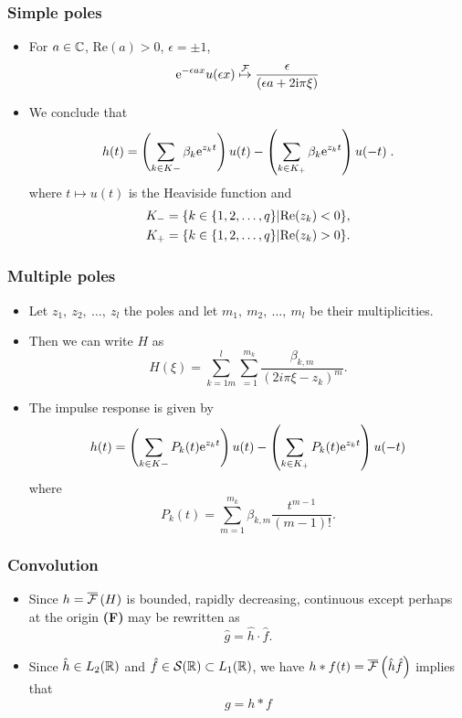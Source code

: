 \begin{frame}
\frametitle{Simple poles}
\begin{itemize}
\item For $a \in \mathbb{C}$, $\mathrm{Re}(a) > 0$, $\epsilon= \pm 1$,
\[
\mathrm{e}^{-\epsilon a x} u(\epsilon x) \stackrel{\mathcal{F}}{\mapsto} \frac{\epsilon}{(\epsilon a + 2 \mathrm{i} \pi \xi)}
\]
\item We conclude that
$$
h(t)=\left(\sum_{k\in K-}\beta_{k} \mathrm{e}^{z_{k}t} \right)u(t)- \left(\sum_{k\in K_{+}}\beta_{k} \mathrm{e}^{z_{k}t} \right)u(-t) \;.
$$
where $t \mapsto u(t)$ is the Heaviside function and
\begin{align*}
K_{-} &=\{k\in\{1,2,\ldots,q\}|{\rm Re}(z_{k})<0\}, \\
K_{+} &=\{k\in\{1,2,\ldots,q\}|{\rm Re}(z_{k})>0\}.
\end{align*}
\end{itemize}
\end{frame}

\begin{frame}
\frametitle{Multiple poles}
\begin{itemize}
\item Let $z_{1},\ z_{2},\ \ldots,\ z_{l}$ the poles and let $m_{1},\ m_{2},\ \ldots,\ m_{l}$ be their multiplicities.
\item Then we can write $H$ as
$$
H(\xi)=\sum_{k=1m}^{l}\sum_{=1}^{m_{k}}\frac{\beta_{k,m}}{(2i\pi\xi-z_{k})^{m}}.
$$
\item The impulse response is given by
$$
h(t)=\left(\displaystyle \sum_{k\in K-}P_{k}(t) \mathrm{e}^{z_{k}t}\right)u(t)-\left(\sum_{k\in K_{+}}P_{k}(t) \mathrm{e}^{z_{k}t}\right)u(-t)
$$
where
$$
P_{k}(t)=\sum_{m=1}^{m_{k}}\beta_{k,m} \frac{t^{m-1}}{(m-1)!}.
$$
\end{itemize}
\end{frame}


\begin{frame}
\frametitle{Convolution}
\begin{itemize}
\item Since $h=\overline{\mathcal{F}}\left( H \right)$ is bounded, rapidly decreasing, continuous except perhaps at the origin
\alert{\textbf{(F)}} may be rewritten as
$$
\hat{g}=\hat{h}\cdot\hat{f}.
$$
\item Since $\hat{h} \in L_2(\mathbb{R})$ and $\hat{f} \in \mathcal{S}(\mathbb{R}) \subset L_1(\mathbb{R})$,
we have $h * f(t)= \overline{\mathcal{F}}\left( \hat{h} \hat{f} \right)$ implies that
$$
g=h*f
$$
\end{itemize}
\end{frame}

